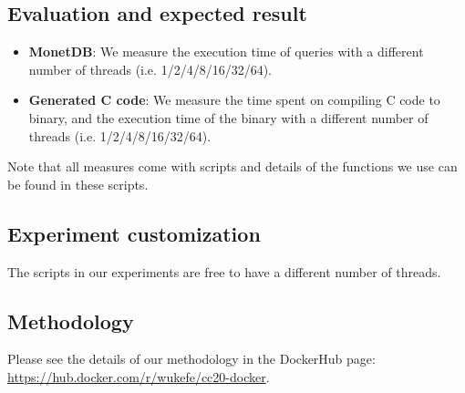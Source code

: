 {%
\subsection{Evaluation and expected result}

\begin{itemize}
    \item  \textbf{MonetDB}: We measure the execution time of queries with a different number of threads (i.e. 1/2/4/8/16/32/64).
    \item \textbf{Generated C code}: We measure the time spent on compiling C code to binary, and the execution time of the binary with a different number of threads (i.e. 1/2/4/8/16/32/64).
\end{itemize}

\noindent Note that all measures come with scripts and details of the functions we use can be found in these scripts.

\subsection{Experiment customization}
The scripts in our experiments are free to have a different number of threads.






\subsection{Methodology}

Please see the details of our methodology in the DockerHub page: 
\url{https://hub.docker.com/r/wukefe/cc20-docker}.

}

